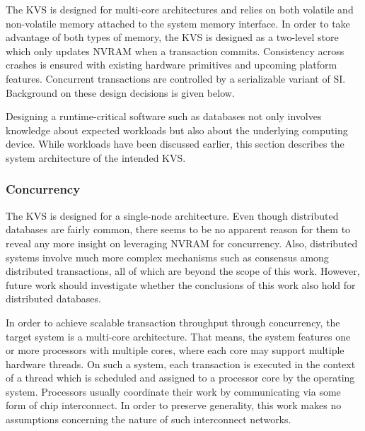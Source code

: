 The \ac{KVS} is designed for multi-core architectures and relies on both
volatile and non-volatile memory attached to the system memory interface. In
order to take advantage of both types of memory, the \ac{KVS} is designed as a
two-level store which only updates \ac{NVRAM} when a transaction commits.
Consistency across crashes is ensured with existing hardware primitives and
upcoming platform features. Concurrent transactions are controlled by a
serializable variant of \ac{SI}. Background on these design decisions is given
below.

Designing a runtime-critical software such as databases not only involves
knowledge about expected workloads but also about the underlying computing
device. While workloads have been discussed earlier, this section describes the
system architecture of the intended \ac{KVS}.

\subsubsection{Concurrency}

The \ac{KVS} is designed for a single-node architecture. Even though distributed
databases are fairly common, there seems to be no apparent reason for them to
reveal any more insight on leveraging \ac{NVRAM} for concurrency. Also,
distributed systems involve much more complex mechanisms such as consensus among
distributed transactions, all of which are beyond the scope of this work.
However, future work should investigate whether the conclusions of this work
also hold for distributed databases.

In order to achieve scalable transaction throughput through concurrency, the
target system is a multi-core architecture. That means, the system features one
or more processors with multiple cores, where each core may support multiple
hardware threads. On such a system, each transaction is executed in the context
of a thread which is scheduled and assigned to a processor core by the operating
system. Processors usually coordinate their work by communicating via some form
of chip interconnect. In order to preserve generality, this work makes no
assumptions concerning the nature of such interconnect networks.


